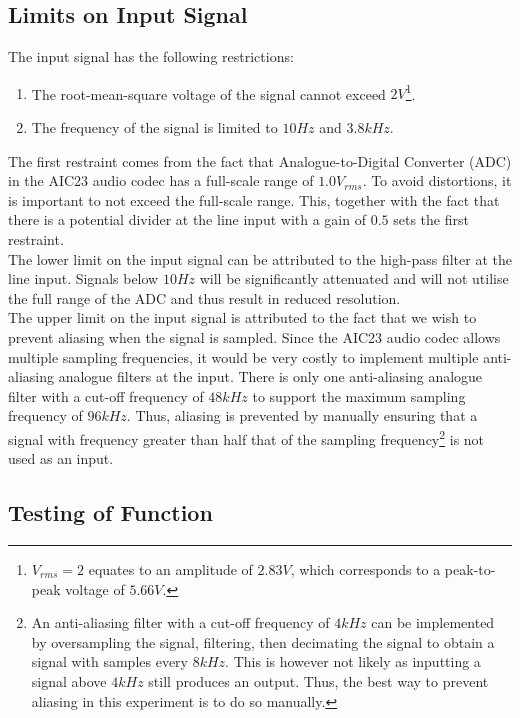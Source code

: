 \documentclass{article}
\begin{document}
\subsection{Limits on Input Signal}

The input signal has the following restrictions:

\begin{enumerate}
    \item The root-mean-square voltage of the signal cannot exceed $2V$\footnote{$V_{rms}=2$ equates to an amplitude of $2.83V$, which corresponds to a peak-to-peak voltage of $5.66V$.}.
    \item The frequency of the signal is limited to $10Hz$ and $3.8kHz$. 
\end{enumerate}

The first restraint comes from the fact that Analogue-to-Digital Converter (ADC) in the AIC23 audio codec has a full-scale range of $1.0V_{rms}$. To avoid distortions, it is important to not exceed the full-scale range\cite{AIC23_technical_reference}. This, together with the fact that there is a potential divider at the line input with a gain of $0.5$ sets the first restraint.\\

The lower limit on the input signal can be attributed to the high-pass filter at the line input. Signals below $10Hz$ will be significantly attenuated and will not utilise the full range of the ADC and thus result in reduced resolution. \\

The upper limit on the input signal is attributed to the fact that we wish to prevent aliasing when the signal is sampled. Since the AIC23 audio codec allows multiple sampling frequencies, it would be very costly to implement multiple anti-aliasing analogue filters at the input. There is only one anti-aliasing analogue filter with a cut-off frequency of $48kHz$ to support the maximum sampling frequency of $96kHz$. Thus, aliasing is prevented by manually ensuring that a signal with frequency greater than half that of the sampling frequency\footnote{An anti-aliasing filter with a cut-off frequency of $4kHz$ can be implemented by oversampling the signal, filtering, then decimating the signal to obtain a signal with samples every $8kHz$. This is however not likely as inputting a signal above $4kHz$ still produces an output. Thus, the best way to prevent aliasing in this experiment is to do so manually.} is not used as an input.

\newpage
\subsection{Testing of Function}
\end{document}

